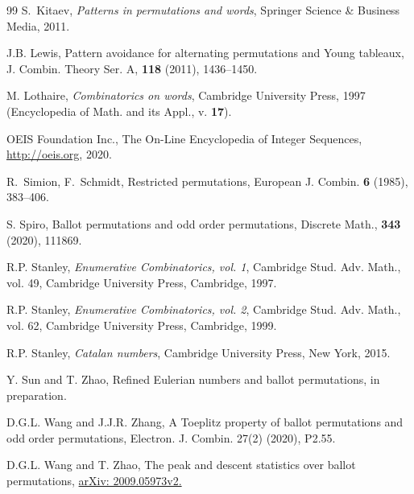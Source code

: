 \documentclass[12pt]{amsart}
\numberwithin{equation}{section}
\theoremstyle{plain}
\theoremstyle{definition}
\begin{document}
\begin{thebibliography}{99}
 S.~Kitaev, {\em Patterns in permutations and words}, Springer Science \& Business Media, 2011. 


 J.B. Lewis,
Pattern avoidance for alternating permutations and Young tableaux, 
J. Combin. Theory Ser. A, {\bf118} (2011), 1436--1450.

 M. Lothaire, {\em Combinatorics on words}, Cambridge University Press, 1997 (Encyclopedia of Math. and its Appl., v. {\bf17}).

 OEIS Foundation Inc., The On-Line Encyclopedia of Integer Sequences,  \href{http://oeis.org}{http://oeis.org}, 2020.

 R.~Simion, F.~Schmidt, Restricted permutations, European J. Combin. {\bf6} (1985), 383--406.

 S. Spiro, Ballot permutations and odd order permutations, Discrete Math., {\bf343} (2020), 111869.

 R.P. Stanley, {\em Enumerative Combinatorics, vol. 1}, Cambridge Stud. Adv. Math., vol. 49, Cambridge University Press, Cambridge, 1997.

 R.P. Stanley, {\em Enumerative Combinatorics, vol. 2}, Cambridge Stud. Adv. Math., vol. 62, Cambridge University Press, Cambridge, 1999.

 R.P. Stanley,
{\em Catalan numbers}, Cambridge University Press, New York, 2015.

 Y. Sun and T. Zhao, Refined Eulerian numbers and ballot permutations, in preparation. 

 D.G.L. Wang and J.J.R. Zhang, A Toeplitz property of ballot permutations and odd order permutations, Electron. J. Combin. 27(2) (2020), P2.55.

 D.G.L. Wang and T. Zhao, The peak and descent statistics over ballot permutations, \href{https://arxiv.org/abs/2009.05973v2}{arXiv: 2009.05973v2.}




\end{thebibliography}
\end{document}
